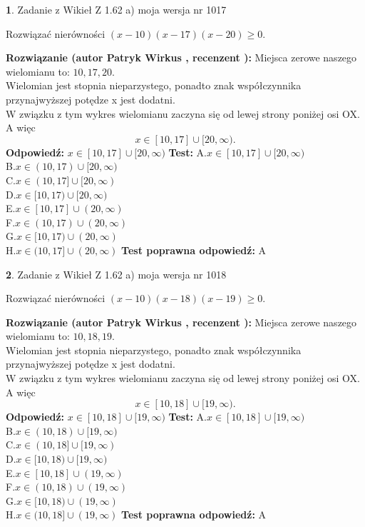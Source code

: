\documentclass[12pt, a4paper]{article}
\theoremstyle{definition} %
\newtheorem{zad}{}
\newcommand{\zadStart}[1]{\begin{zad}#1\newline}
\newcommand{\zadStop}{\end{zad}}
\newcommand{\rozwStart}[2]{\noindent \textbf{Rozwiązanie (autor #1 , recenzent #2): }\newline}
\newcommand{\rozwStop}{\newline}
\newcommand{\odpStart}{\noindent \textbf{Odpowiedź:}\newline}
\newcommand{\odpStop}{\newline}
\newcommand{\testStart}{\noindent \textbf{Test:}\newline}
\newcommand{\testStop}{\newline}
\newcommand{\kluczStart}{\noindent \textbf{Test poprawna odpowiedź:}\newline}
\newcommand{\kluczStop}{\newline}
\begin{document}
\zadStart{Zadanie z Wikieł Z 1.62 a) moja wersja nr 1017}

Rozwiązać nierówności $(x-10)(x-17)(x-20)\ge0$.
\zadStop
\rozwStart{Patryk Wirkus}{}
Miejsca zerowe naszego wielomianu to: $10, 17, 20$.\\
Wielomian jest stopnia nieparzystego, ponadto znak współczynnika przy\linebreak najwyższej potędze x jest dodatni.\\ W związku z tym wykres wielomianu zaczyna się od lewej strony poniżej osi OX. A więc $$x \in [10,17] \cup [20,\infty).$$
\rozwStop
\odpStart
$x \in [10,17] \cup [20,\infty)$
\odpStop
\testStart
A.$x \in [10,17] \cup [20,\infty)$\\
B.$x \in (10,17) \cup [20,\infty)$\\
C.$x \in (10,17] \cup [20,\infty)$\\
D.$x \in [10,17) \cup [20,\infty)$\\
E.$x \in [10,17] \cup (20,\infty)$\\
F.$x \in (10,17) \cup (20,\infty)$\\
G.$x \in [10,17) \cup (20,\infty)$\\
H.$x \in (10,17] \cup (20,\infty)$
\testStop
\kluczStart
A
\kluczStop



\zadStart{Zadanie z Wikieł Z 1.62 a) moja wersja nr 1018}

Rozwiązać nierówności $(x-10)(x-18)(x-19)\ge0$.
\zadStop
\rozwStart{Patryk Wirkus}{}
Miejsca zerowe naszego wielomianu to: $10, 18, 19$.\\
Wielomian jest stopnia nieparzystego, ponadto znak współczynnika przy\linebreak najwyższej potędze x jest dodatni.\\ W związku z tym wykres wielomianu zaczyna się od lewej strony poniżej osi OX. A więc $$x \in [10,18] \cup [19,\infty).$$
\rozwStop
\odpStart
$x \in [10,18] \cup [19,\infty)$
\odpStop
\testStart
A.$x \in [10,18] \cup [19,\infty)$\\
B.$x \in (10,18) \cup [19,\infty)$\\
C.$x \in (10,18] \cup [19,\infty)$\\
D.$x \in [10,18) \cup [19,\infty)$\\
E.$x \in [10,18] \cup (19,\infty)$\\
F.$x \in (10,18) \cup (19,\infty)$\\
G.$x \in [10,18) \cup (19,\infty)$\\
H.$x \in (10,18] \cup (19,\infty)$
\testStop
\kluczStart
A
\kluczStop
\end{document}
